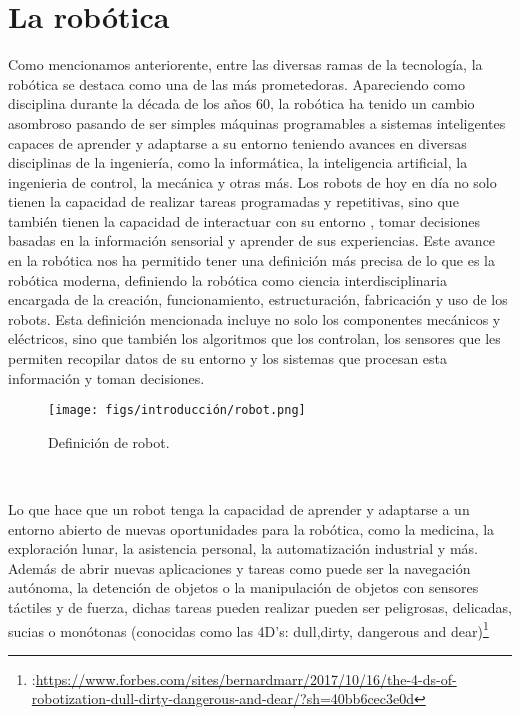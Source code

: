 \section{La robótica}
\label{sec:enfoquesrobotica}
Como mencionamos anteriorente, entre las diversas ramas de la tecnología, la robótica se destaca como una de las más prometedoras. Apareciendo como disciplina durante la década de los años 60, 
la robótica ha tenido un cambio asombroso  pasando de ser simples máquinas programables a sistemas inteligentes capaces de aprender y adaptarse 
a su entorno teniendo avances en diversas disciplinas de la ingeniería, como la informática, la inteligencia artificial, la ingenieria de control, la mecánica y otras más. 
Los robots de hoy en día no solo tienen la capacidad de realizar tareas programadas y repetitivas, sino que también tienen la capacidad de interactuar con su entorno
, tomar decisiones basadas en la información sensorial y aprender de sus experiencias. Este avance en la robótica nos ha permitido tener una definición más precisa de lo que es 
la robótica moderna, definiendo la robótica como ciencia interdisciplinaria encargada de la creación, funcionamiento, estructuración, fabricación y uso de los robots. 
Esta definición mencionada incluye no solo los componentes mecánicos y eléctricos, sino que también los algoritmos que los controlan, los sensores que les permiten recopilar
datos de su entorno y los sistemas que procesan esta información y toman decisiones.

\begin{figure} [H]
  \begin{center}
    \texttt{[image: figs/introducción/robot.png]}
  \end{center}
  \caption{Definición de robot.}
  \label{fig:robot}
\end{figure}\

Lo que hace que un robot tenga la capacidad de aprender y adaptarse a un entorno abierto de nuevas oportunidades para la robótica, como la medicina, la exploración
lunar, la asistencia personal, la automatización industrial y más. Además de abrir nuevas aplicaciones y tareas como puede ser la navegación autónoma, la detención de objetos o 
la manipulación de objetos con sensores táctiles y de fuerza, dichas tareas pueden realizar pueden ser peligrosas, delicadas, sucias o monótonas 
(conocidas como las 4D's: dull,dirty, dangerous and dear)\footnote{:\url{https://www.forbes.com/sites/bernardmarr/2017/10/16/the-4-ds-of-robotization-dull-dirty-dangerous-and-dear/?sh=40bb6cec3e0d}}

